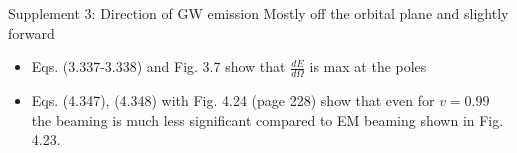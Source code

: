 \documentclass[xcolor=dvipsnames,t]{beamer}
\begin{document}
\begin{frame}{Supplement 3: Direction of GW emission}
 Mostly off the orbital plane and slightly forward
 \begin{itemize}
  \item Eqs. (3.337-3.338) and Fig. 3.7 show that $\tfrac{d\dot{E}}{d\Omega}$ is max at the poles
  \item Eqs. (4.347), (4.348) with Fig. 4.24 (page 228) show that even for $v=0.99$ the beaming
  is much less significant compared to EM beaming shown in Fig. 4.23.
 \end{itemize}

\end{frame}
\end{document}
